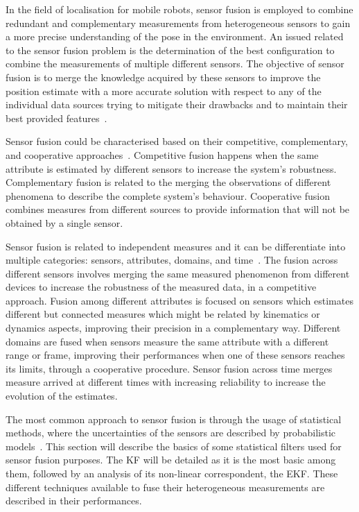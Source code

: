 \noindent
In the field of localisation for mobile robots, sensor fusion is employed to combine redundant and complementary measurements from heterogeneous sensors to gain a more precise understanding of the pose in the environment.
An issued related to the sensor fusion problem is the determination of the best configuration to combine the measurements of multiple different sensors.
The objective of sensor fusion is to merge the knowledge acquired by these sensors to improve the position estimate with a more accurate solution with respect to any of the individual data sources trying to mitigate their drawbacks and to maintain their best provided features~\cite{mitchell_multi-sensor_2007}.

Sensor fusion could be characterised based on their competitive, complementary, and cooperative approaches~\cite{1199023}.
Competitive fusion happens when the same attribute is estimated by different sensors to increase the system's robustness.
Complementary fusion is related to the merging the observations of different phenomena to describe the complete system's behaviour.
Cooperative fusion combines measures from different sources to provide information that will not be obtained by a single sensor.

Sensor fusion is related to independent measures and it can be differentiate into multiple categories: sensors, attributes, domains, and time~\cite{weckenmann_multisensor_2009}.
The fusion across different sensors involves merging the same measured phenomenon from different devices to increase the robustness of the measured data, in a competitive approach.
Fusion among different attributes is focused on sensors which estimates different but connected measures which might be related by kinematics or dynamics aspects, improving their precision in a complementary way.
Different domains are fused when sensors measure the same attribute with a different range or frame, improving their performances when one of these sensors reaches its limits, through a cooperative procedure.
Sensor fusion across time merges measure arrived at different times with increasing reliability to increase the evolution of the estimates.

The most common approach to sensor fusion is through the usage of statistical methods, where the uncertainties of the sensors are described by probabilistic models~\cite{gustafsson_statistical_2010}.
This section will describe the basics of some statistical filters used for sensor fusion purposes.
The \gls{KF} will be detailed as it is the most basic among them, followed by an analysis of its non-linear correspondent, the \gls{EKF}. 
These different techniques available to fuse their heterogeneous measurements are described in their performances.

